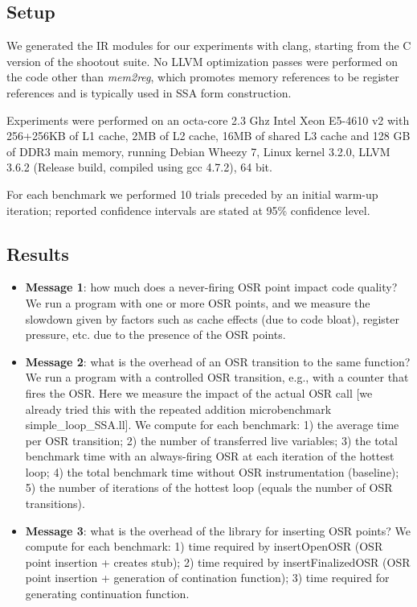 \subsection{Setup}

We generated the IR modules for our experiments with clang, starting from the C version of the shootout suite. No LLVM optimization passes were performed on the code other than {\em mem2reg}, which promotes memory references to be register references and is typically used in SSA form construction.

Experiments were performed on an octa-core 2.3 Ghz Intel Xeon E5-4610 v2 with 256+256KB of L1 cache, 2MB of L2 cache, 16MB of shared L3 cache and 128 GB of DDR3 main memory, running Debian Wheezy 7, Linux kernel 3.2.0, LLVM 3.6.2 (Release build, compiled using gcc 4.7.2), 64 bit.

For each benchmark we performed 10 trials preceded by an initial warm-up iteration; reported confidence intervals are stated at 95\% confidence level.

\subsection{Results}

\begin{itemize}
\item {\bf Message 1}: how much does a never-firing OSR point impact code quality? We run a program with one or more OSR points, and we measure the slowdown given by factors such as cache effects (due to code bloat), register pressure, etc. due to the presence of the OSR points.
\item {\bf Message 2}: what is the overhead of an OSR transition to the same function? We run a program with a controlled OSR transition, e.g., with a counter that fires the OSR. Here we measure the impact of the actual OSR call [we already tried this with the repeated addition microbenchmark simple\_loop\_SSA.ll]. We compute for each benchmark: 1) the average time per OSR transition; 2) the number of transferred live variables; 3) the total benchmark time with an always-firing OSR at each iteration of the hottest loop; 4) the total benchmark time without OSR instrumentation (baseline); 5) the number of iterations of the hottest loop (equals the number of OSR transitions).
\item {\bf Message 3}: what is the overhead of the library for inserting OSR points? We compute for each benchmark: 1) time required by insertOpenOSR (OSR point insertion + creates stub); 2) time required by insertFinalizedOSR (OSR point insertion + generation of contination function); 3) time required for generating continuation function.
\end{itemize}

